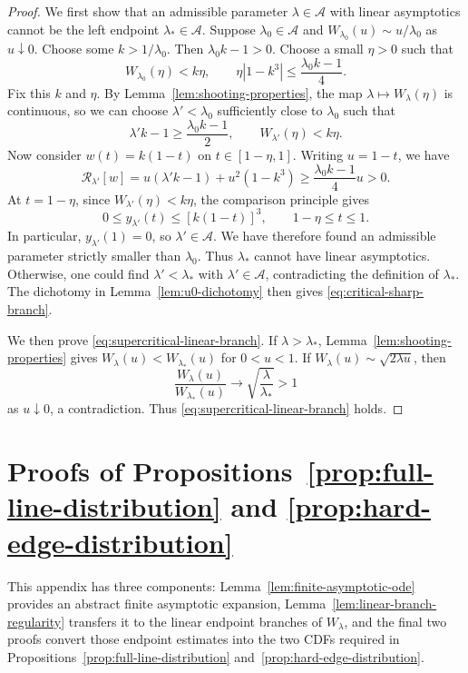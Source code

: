 \documentclass[12pt,preprint]{amsart}
\numberwithin{equation}{section}
\theoremstyle{plain}
\theoremstyle{definition}
\begin{document}
\begin{proof}
We first show that an admissible parameter $\lambda\in\mathcal A$ with
linear asymptotics cannot be the left endpoint $\lambda_*\in\mathcal A$.
Suppose $\lambda_0\in\mathcal A$ and
\(W_{\lambda_0}(u)\sim u/\lambda_0\) as \(u\downarrow 0\).
Choose some \(k>1/\lambda_0\). Then
\(\lambda_0k-1>0\). Choose a small \(\eta>0\) such that
\[
 W_{\lambda_0}(\eta)<k\eta,
 \qquad
 \eta|1-k^3|\le\frac{\lambda_0k-1}{4}.
\]
Fix this \(k\) and \(\eta\). By Lemma~\ref{lem:shooting-properties}, the map
\(\lambda\mapsto W_\lambda(\eta)\) is continuous, so we can choose \(\lambda'<\lambda_0\) sufficiently close
to \(\lambda_0\) such that
\[
 \lambda'k-1\ge\frac{\lambda_0k-1}{2},
 \qquad
 W_{\lambda'}(\eta)<k\eta.
\]
Now consider $w(t)=k(1-t)$ on $t\in[1-\eta,1]$.  Writing
$u=1-t$, we have
\[
 \mathcal R_{\lambda'}[w]
 =u(\lambda'k-1)+u^2(1-k^3)
 \ge\frac{\lambda_0k-1}{4}u>0.
\]
At \(t=1-\eta\), since \(W_{\lambda'}(\eta)<k\eta\), the comparison principle gives
\[
 0\le y_{\lambda'}(t)\le[k(1-t)]^3,
 \qquad 1-\eta\le t\le1.
\]
In particular, \(y_{\lambda'}(1)=0\), so \(\lambda'\in\mathcal A\).  We have
therefore found an admissible parameter strictly smaller than \(\lambda_0\).
Thus $\lambda_*$ cannot have linear asymptotics.  Otherwise, one could
find $\lambda'<\lambda_*$ with $\lambda'\in\mathcal A$, contradicting
the definition of $\lambda_*$.  The dichotomy in
Lemma~\ref{lem:u0-dichotomy} then gives
\eqref{eq:critical-sharp-branch}.

We then prove \eqref{eq:supercritical-linear-branch}.
If \(\lambda>\lambda_*\), Lemma~\ref{lem:shooting-properties} gives
$W_\lambda(u)<W_{\lambda_*}(u)$ for $0<u<1$.  If
$W_\lambda(u)\sim\sqrt{2\lambda u}$, then
\[
 \frac{W_\lambda(u)}{W_{\lambda_*}(u)}\longrightarrow
 \sqrt{\frac \lambda{\lambda_*}}>1
\]
as \(u\downarrow0\), a contradiction.  Thus
\eqref{eq:supercritical-linear-branch} holds.
\end{proof}

\section{Proofs of Propositions~\ref{prop:full-line-distribution} and \ref{prop:hard-edge-distribution} }
\label{app:regularity}

This appendix has three components: Lemma~\ref{lem:finite-asymptotic-ode}
provides an abstract finite asymptotic expansion,
Lemma~\ref{lem:linear-branch-regularity} transfers it to the linear endpoint
branches of $W_\lambda$, and the final two proofs convert those endpoint
estimates into the two CDFs required in
Propositions~\ref{prop:full-line-distribution}
and~\ref{prop:hard-edge-distribution}.
\end{document}
